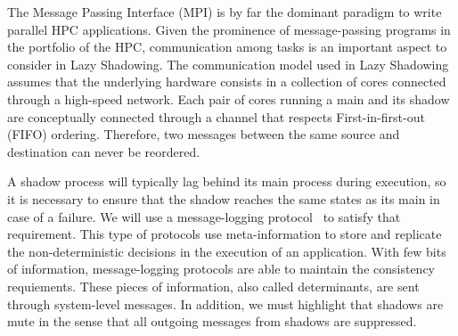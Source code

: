 The Message Passing Interface (MPI) is by far the dominant paradigm to write parallel HPC applications.
Given the prominence of message-passing programs in the portfolio of the HPC, communication among tasks is an important aspect to consider in Lazy Shadowing.
The communication model used in Lazy Shadowing assumes that the underlying 
hardware consists in a collection of cores connected through a high-speed 
network. 
Each pair of cores running a main and its shadow 
are conceptually connected through a channel that respects First-in-first-out 
(FIFO) ordering. Therefore, two messages between the same source and 
destination can never be reordered. 


A shadow process will typically lag behind its main process during execution, so it is necessary to ensure that the shadow reaches the same states as its main in case of a failure. 
We will use a message-logging protocol~\cite{Marz} to satisfy that requirement. This type of protocols use meta-information to store and replicate the non-deterministic decisions in the execution of an application. %
With few bits of information, message-logging protocols are able to maintain the consistency requiements. These pieces of information, also called determinants, are sent through system-level messages. In addition, we must highlight that shadows are mute in the sense that 
all outgoing messages from shadows are suppressed. 


